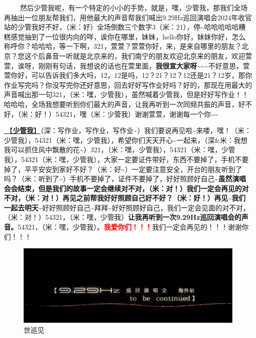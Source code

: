 \documentclass[]{ctexbook}
\begin{document}
   然后少管我呢，有一个特定的小小的手势，就是，嘿，少管我，那我们全场再抽出一位朋友帮我们，用他最大的声音帮我们喊出9.29Hz巡回演唱会2024年收官站的少管我好不好，（米：好）全场倒数三个数字3（米：21），停\textasciitilde 哈哈哈哈哈糟糕感觉抽到了一位很内向的咩，诶你在哪里，妹妹，hello你好，妹妹你好，怎么称呼你？哈哈哈，等一下啊，321，萱萱？萱萱你好，来，是来自哪里的朋友？北京？您这个后鼻音一听就是北京来的，我们南宁的朋友欢迎北京来的朋友，欢迎萱萱，诶呀，刚刚有句话，我想说的话也在萱里面，\textbf{我很宣大家呀\textasciitilde\textasciitilde\textasciitilde{}}不好意思，萱萱你好，可以告诉我们多大吗，12，12是吗，12？21？12？12还是21？12岁，那你作业写完吗？你没写完你还好意思，回去好好写作业好吗？好的，那现在用最大的声音喊出那一句321，（米：嘿，少管我），虽然喊着少管我，但是好好写作业！！哈哈哈，全场我想要听到你们最大的声音，让我再听到一次同频共振的声音，好不好，（米：好！）54321，嘿（米：少管我）谢谢萱萱，谢谢每一个你\textasciitilde\textasciitilde{}

\hyperref[watch-ur-manners]{🎵【\textbf{少管我}】}（深：写作业，写作业，写作业\textasciitilde）我们要说再见啦\textasciitilde 来喽，嘿！（米：少管我），54321（米：嘿，少管我），希望你们天天开心\textasciitilde 一起来，（深\&米：我想我可以抓住风中飘散的花\textasciitilde）321，（米：嘿，少管我），54321（米：嘿，少管我），54321（米：嘿，少管我），大家一定要证件带好，东西不要掉了，手机不要掉了，平平安安到家好不好？（米：好\textasciitilde）一定要注意安全，开台的朋友听到了吗？（米：听到了\textasciitilde）手机不要掉了，证件不要掉了，好好照顾好自己\textasciitilde{}\textbf{虽然演唱会会结束，但是我们的故事一定会继续对不对，（米：对！）我们一定会再见的对不对，（米：对！）再见之前帮我好好照顾自己好不好？（米：好！）再见\textasciitilde 我们一起去明天\textasciitilde{}}好好照顾好自己\textasciitilde 拜拜\textasciitilde 好好照顾好自己，我们一定会见面的对不对，（米：对！）54321，（米：嘿，少管我）\textbf{让我再听到一次9.29Hz巡回演唱会的声音。}54321，（米：嘿，少管我）。\textbf{\textcolor{red}{我爱你们！！！}}我们一定会再见的！！！谢谢你们！！！

\begin{figure}

{\centering \includegraphics[width=400pt]{img/nanning20241207/006} 

}

\caption{世巡见}\label{fig:unnamed-chunk-167}
\end{figure}
\end{document}
